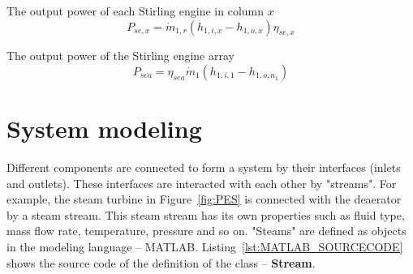 The output power of each Stirling engine in column $x$
\begin{equation}
  P_{se,x}=\dot{m}_{1,r}(h_{1,i,x}-h_{1,o,x})\eta_{se,x}
\end{equation}

The output power of the Stirling engine array
\begin{equation}
  P_{sea}=\eta_{sea}\dot{m}_{1}(h_{1,i,1}-h_{1,o,n_1})
\end{equation}

\section{System modeling}

Different components are connected to form a system by their interfaces (inlets and outlets). These interfaces are interacted with each other by "streams". For example, the steam turbine in Figure~\ref{fig:PES} is connected with the deaerator by a steam stream. This steam stream has its own properties such as fluid type, mass flow rate, temperature, pressure and so on.
"Steams" are defined as objects in the modeling language -- MATLAB. Listing~\ref{lst:MATLAB_SOURCECODE} shows the source code of the definition of the class -- \textbf{Stream}.

